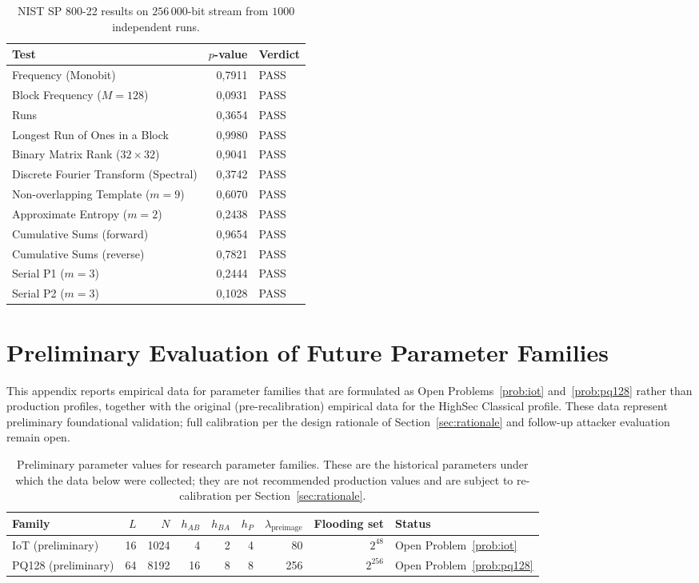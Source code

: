 \documentclass[11pt,a4paper]{article}
\begin{document}
\begin{table}[ht]
\centering
\small
\begin{tabular}{lrl}
\toprule
Test & $p$-value & Verdict \\
\midrule
Frequency (Monobit) & 0{,}7911 & PASS \\
Block Frequency ($M=128$) & 0{,}0931 & PASS \\
Runs & 0{,}3654 & PASS \\
Longest Run of Ones in a Block & 0{,}9980 & PASS \\
Binary Matrix Rank ($32 \times 32$) & 0{,}9041 & PASS \\
Discrete Fourier Transform (Spectral) & 0{,}3742 & PASS \\
Non-overlapping Template ($m=9$) & 0{,}6070 & PASS \\
Approximate Entropy ($m=2$) & 0{,}2438 & PASS \\
Cumulative Sums (forward) & 0{,}9654 & PASS \\
Cumulative Sums (reverse) & 0{,}7821 & PASS \\
Serial P1 ($m=3$) & 0{,}2444 & PASS \\
Serial P2 ($m=3$) & 0{,}1028 & PASS \\
\bottomrule
\end{tabular}
\caption{NIST SP 800-22 results on $256\,000$-bit stream from $1000$ independent runs.}
\label{tab:nist}
\end{table}

\section{Preliminary Evaluation of Future Parameter Families}\label{app:preliminary}

This appendix reports empirical data for parameter families that are formulated as Open Problems~\ref{prob:iot} and~\ref{prob:pq128} rather than production profiles, together with the original (pre-recalibration) empirical data for the HighSec Classical profile. These data represent preliminary foundational validation; full calibration per the design rationale of Section~\ref{sec:rationale} and follow-up attacker evaluation remain open.

\begin{table}[ht]
\centering
\small
\begin{tabular}{lrrrrrrrl}
\toprule
Family & $L$ & $N$ & $h_{AB}$ & $h_{BA}$ & $h_P$ & $\lambda_\text{preimage}$ & Flooding set & Status \\
\midrule
IoT (preliminary) & 16 & 1024 & 4 & 2 & 4 & 80 & $2^{48}$ & Open Problem~\ref{prob:iot} \\
PQ128 (preliminary) & 64 & 8192 & 16 & 8 & 8 & 256 & $2^{256}$ & Open Problem~\ref{prob:pq128} \\
\bottomrule
\end{tabular}
\caption{Preliminary parameter values for research parameter families. These are the historical parameters under which the data below were collected; they are not recommended production values and are subject to re-calibration per Section~\ref{sec:rationale}.}
\label{tab:profiles-baseline}
\end{table}
\end{document}
